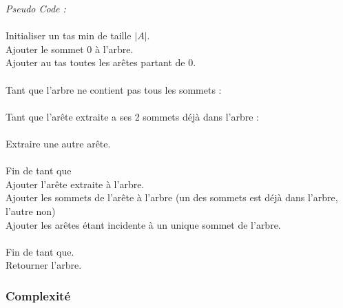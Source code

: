\documentclass[a4paper,11pt]{article}
\begin{document}
\textit{Pseudo Code :}\\
\\
Initialiser un tas min de taille $|A|$.\\
Ajouter le sommet 0 à l'arbre.\\
Ajouter au tas toutes les arêtes partant de 0.\\
\\
Tant que l'arbre ne contient pas tous les sommets :\\
\\
\hspace*{1cm}Tant que l'arête extraite a ses 2 sommets déjà dans l'arbre :\\
\\
\hspace*{2cm}Extraire une autre arête.\\
\\
\hspace*{1cm}Fin de tant que\\
\hspace*{1cm}Ajouter l'arête extraite à l'arbre.\\
\hspace*{1cm}Ajouter les sommets de l'arête à l'arbre (un des sommets est déjà dans l'arbre, l'autre non)\\
\hspace*{1cm}Ajouter les arêtes étant incidente à un unique sommet de l'arbre.\\
\\
Fin de tant que.\\
Retourner l'arbre.\\

\subsubsection*{Complexité}
\end{document}
